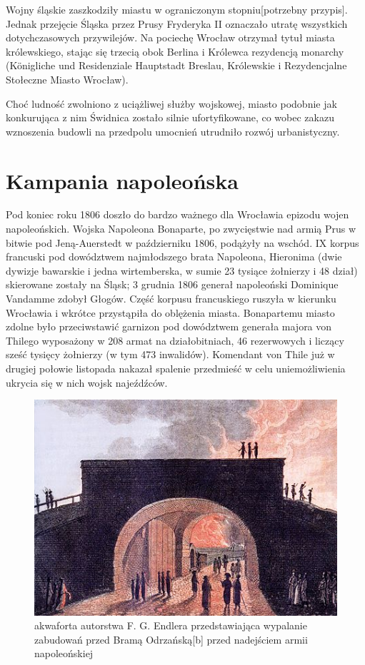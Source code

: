 \documentclass{article}
\begin{document}
Wojny śląskie zaszkodziły miastu w ograniczonym stopniu[potrzebny przypis]. Jednak przejęcie Śląska przez Prusy Fryderyka II oznaczało utratę wszystkich dotychczasowych przywilejów. Na pociechę Wrocław otrzymał tytuł miasta królewskiego, stając się trzecią obok Berlina i Królewca rezydencją monarchy (Königliche und Residenziale Hauptstadt Breslau, Królewskie i Rezydencjalne Stołeczne Miasto Wrocław).

Choć ludność zwolniono z uciążliwej służby wojskowej, miasto podobnie jak konkurująca z nim Świdnica zostało silnie ufortyfikowane, co wobec zakazu wznoszenia budowli na przedpolu umocnień utrudniło rozwój urbanistyczny.

\section{Kampania napoleońska}
\hrulefill

Pod koniec roku 1806 doszło do bardzo ważnego dla Wrocławia epizodu wojen napoleońskich. Wojska Napoleona Bonaparte, po zwycięstwie nad armią Prus w bitwie pod Jeną-Auerstedt w październiku 1806, podążyły na wschód. IX korpus francuski pod dowództwem najmłodszego brata Napoleona, Hieronima (dwie dywizje bawarskie i jedna wirtemberska, w sumie 23 tysiące żołnierzy i 48 dział) skierowane zostały na Śląsk; 3 grudnia 1806 generał napoleoński Dominique Vandamme zdobył Głogów. Część korpusu francuskiego ruszyła w kierunku Wrocławia i wkrótce przystąpiła do oblężenia miasta. Bonapartemu miasto zdolne było przeciwstawić garnizon pod dowództwem generała majora von Thilego wyposażony w 208 armat na działobitniach, 46 rezerwowych i liczący sześć tysięcy żołnierzy (w tym 473 inwalidów). Komendant von Thile już w drugiej połowie listopada nakazał spalenie przedmieść w celu uniemożliwienia ukrycia się w nich wojsk najeźdźców.
 \begin{figure}[h!]
\centering
\includegraphics[scale=2]{6.jpg}
\caption{akwaforta autorstwa F. G. Endlera przedstawiająca wypalanie zabudowań przed Bramą Odrzańską[b] przed nadejściem armii napoleońskiej}
\end{figure}
\end{document}
